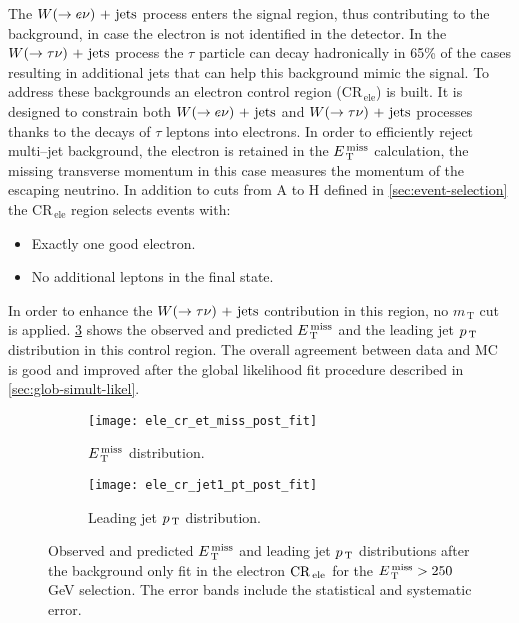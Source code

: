 The $W (\rightarrow e \nu)\mathrm{~+~jets}$ process enters the signal region, thus contributing to the
background, in case the electron is not identified in the detector. In the
$W (\rightarrow \tau \nu)\mathrm{~+~jets}$ process the $\tau$ particle can decay hadronically in 65\% of
the cases resulting in additional jets that can help this background mimic the
signal. To address these backgrounds an electron control region
(CR$_\mathrm{\, ele}$) is built. It is designed to constrain both
$W (\rightarrow e \nu)\mathrm{~+~jets}$ and $W (\rightarrow \tau \nu)\mathrm{~+~jets}$ processes thanks to the decays of $\tau$
leptons into electrons. In order to efficiently reject multi--jet background,
the electron is retained in the $E_\mathrm{\, T}^\mathrm{\, miss}$ calculation, the missing transverse
momentum in this case measures the momentum of the escaping neutrino. In
addition to cuts from A to H defined in \cref{sec:event-selection} the
CR$_\mathrm{\, ele}$ region selects events with:
\begin{itemize}
\item Exactly one good electron.
\item No additional leptons in the final state.
\end{itemize}
In order to enhance the $W (\rightarrow \tau \nu)\mathrm{~+~jets}$ contribution in this region, no
$m_\mathrm{\, T}$ cut is applied. \cref{fig:ele_cr_plots} shows the observed and
predicted $E_\mathrm{\, T}^\mathrm{\, miss}$ and the leading jet $p_\mathrm{\, T}$ distribution in this control region. The
overall agreement between data and MC is good and improved after the global
likelihood fit procedure described in \cref{sec:glob-simult-likel}.
\begin{figure}[!h]
  \centering
  \begin{subfigure}[t]{.48\linewidth}
    \texttt{[image: ele\_cr\_et\_miss\_post\_fit]}
    \caption{$E_\mathrm{\, T}^\mathrm{\, miss}$ distribution.}
    \label{fig:ele_cr_et_miss_pre_fit}
  \end{subfigure}
  \begin{subfigure}[t]{.48\linewidth}
    \texttt{[image: ele\_cr\_jet1\_pt\_post\_fit]}
    \caption{Leading jet $p_\mathrm{\, T}$ distribution.}
    \label{fig:ele_cr_jet1_pt_pre_fit}
  \end{subfigure}
  \caption{Observed and predicted $E_\mathrm{\, T}^\mathrm{\, miss}$ and leading jet $p_\mathrm{\, T}$ distributions
    after the background only fit in the electron $\mathrm{CR}_\mathrm{\, ele}$ for the
    $E_\mathrm{\, T}^\mathrm{\, miss} > 250~$GeV selection. The error bands include the statistical and
    systematic error.}
  \label{fig:ele_cr_plots}
\end{figure}
